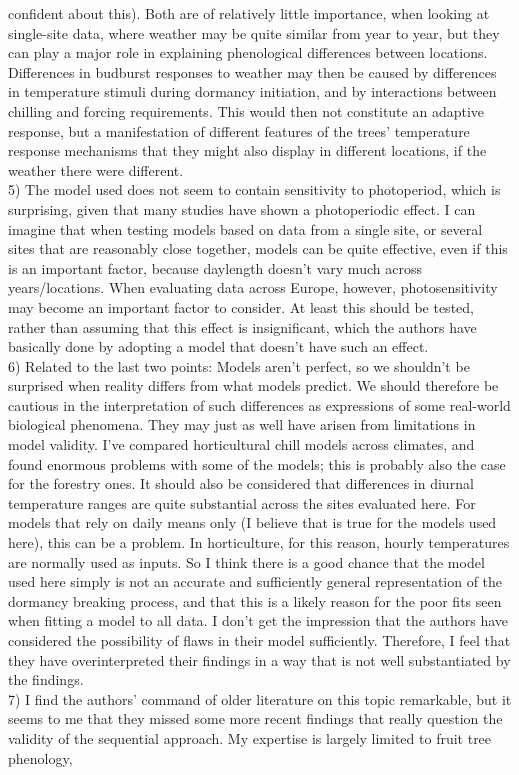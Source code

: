 \documentclass[11pt]{article}
\begin{document}
confident about this). Both are of relatively little importance, when looking at
single-site data, where weather may be quite similar from year to year, but they can play
a major role in explaining phenological differences between locations. Differences in
budburst responses to weather may then be caused by differences in temperature stimuli
during dormancy initiation, and by interactions between chilling and forcing
requirements. This would then not constitute an adaptive response, but a manifestation of
different features of the trees’ temperature response mechanisms that they might also
display in different locations, if the weather there were different.\\
5)      The model used does not seem to contain sensitivity to photoperiod, which is
surprising, given that many studies have shown a photoperiodic effect. I can imagine that
when testing models based on data from a single site, or several sites that are
reasonably close together, models can be quite effective, even if this is an important
factor, because daylength doesn’t vary much across years/locations. When evaluating data
across Europe, however, photosensitivity may become an important factor to consider. At
least this should be tested, rather than assuming that this effect is insignificant,
which the authors have basically done by adopting a model that doesn’t have such an
effect.\\
6)      Related to the last two points: Models aren’t perfect, so we shouldn’t be
surprised when reality differs from what models predict. We should therefore be cautious
in the interpretation of such differences as expressions of some real-world biological
phenomena. They may just as well have arisen from limitations in model validity. I’ve
compared horticultural chill models across climates, and found enormous problems with
some of the models; this is probably also the case for the forestry ones. It should also
be considered that differences in diurnal temperature ranges are quite substantial across
the sites evaluated here. For models that rely on daily means only (I believe that is
true for the models used here), this can be a problem. In horticulture, for this reason,
hourly temperatures are normally used as inputs. So I think there is a good chance that
the model used here simply is not an accurate and sufficiently general representation of
the dormancy breaking process, and that this is a likely reason for the poor fits seen
when fitting a model to all data. I don’t get the impression that the authors have
considered the possibility of flaws in their model sufficiently. Therefore, I feel that
they have overinterpreted their findings in a way that is not well substantiated by the
findings.\\
7)      I find the authors’ command of older literature on this topic remarkable, but it
seems to me that they missed some more recent findings that really question the validity
of the sequential approach. My expertise is largely limited to fruit tree phenology,
\end{document}
